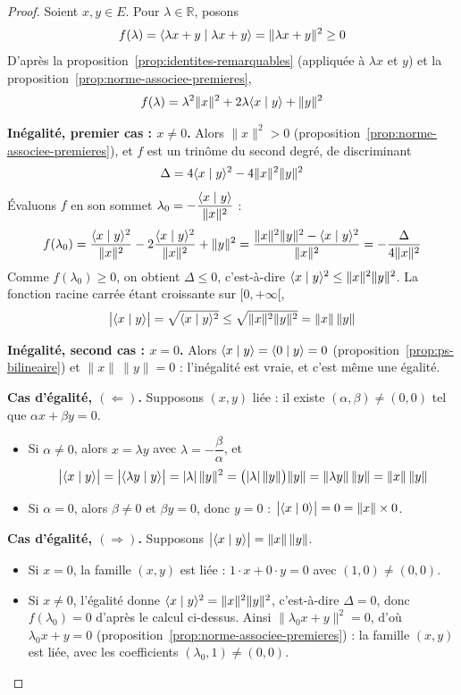 \begin{proof}
Soient $x,y\in E$. Pour $\lambda\in\mathbb{R}$, posons
\[f(\lambda)=\langle \lambda x+y\mid \lambda x+y\rangle=\|\lambda x+y\|^2\geq 0\]
D'après la proposition~\ref{prop:identites-remarquables} (appliquée à $\lambda x$ et $y$) et la proposition~\ref{prop:norme-associee-premieres},
\[f(\lambda)=\lambda^2\|x\|^2+2\lambda\langle x\mid y\rangle+\|y\|^2\]

\textbf{Inégalité, premier cas : $x\neq 0$.} Alors $\|x\|^2>0$ (proposition~\ref{prop:norme-associee-premieres}), et $f$ est un trinôme du second degré, de discriminant
\[\Delta=4\langle x\mid y\rangle^2-4\|x\|^2\|y\|^2\]
Évaluons $f$ en son sommet $\lambda_0=-\dfrac{\langle x\mid y\rangle}{\|x\|^2}$ :
\[f(\lambda_0)=\frac{\langle x\mid y\rangle^2}{\|x\|^2}-2\frac{\langle x\mid y\rangle^2}{\|x\|^2}+\|y\|^2=\frac{\|x\|^2\|y\|^2-\langle x\mid y\rangle^2}{\|x\|^2}=-\frac{\Delta}{4\|x\|^2}\]
Comme $f(\lambda_0)\geq 0$, on obtient $\Delta\leq 0$, c'est-à-dire $\langle x\mid y\rangle^2\leq\|x\|^2\|y\|^2$. La fonction racine carrée étant croissante sur $[0,+\infty[$,
\[\big|\langle x\mid y\rangle\big|=\sqrt{\langle x\mid y\rangle^2}\leq\sqrt{\|x\|^2\|y\|^2}=\|x\|\,\|y\|\]

\textbf{Inégalité, second cas : $x=0$.} Alors $\langle x\mid y\rangle=\langle 0\mid y\rangle=0$ (proposition~\ref{prop:ps-bilineaire}) et $\|x\|\,\|y\|=0$ : l'inégalité est vraie, et c'est même une égalité.

\textbf{Cas d'égalité, $(\Leftarrow)$.} Supposons $(x,y)$ liée : il existe $(\alpha,\beta)\neq(0,0)$ tel que $\alpha x+\beta y=0$.
\begin{itemize}
\item Si $\alpha\neq 0$, alors $x=\lambda y$ avec $\lambda=-\dfrac{\beta}{\alpha}$, et
\[\big|\langle x\mid y\rangle\big|=\big|\langle \lambda y\mid y\rangle\big|=|\lambda|\,\|y\|^2=\big(|\lambda|\,\|y\|\big)\|y\|=\|\lambda y\|\,\|y\|=\|x\|\,\|y\|\]
\item Si $\alpha=0$, alors $\beta\neq 0$ et $\beta y=0$, donc $y=0$ : $\big|\langle x\mid 0\rangle\big|=0=\|x\|\times 0$.
\end{itemize}

\textbf{Cas d'égalité, $(\Rightarrow)$.} Supposons $\big|\langle x\mid y\rangle\big|=\|x\|\,\|y\|$.
\begin{itemize}
\item Si $x=0$, la famille $(x,y)$ est liée : $1\cdot x+0\cdot y=0$ avec $(1,0)\neq(0,0)$.
\item Si $x\neq 0$, l'égalité donne $\langle x\mid y\rangle^2=\|x\|^2\|y\|^2$, c'est-à-dire $\Delta=0$, donc $f(\lambda_0)=0$ d'après le calcul ci-dessus. Ainsi $\|\lambda_0x+y\|^2=0$, d'où $\lambda_0x+y=0$ (proposition~\ref{prop:norme-associee-premieres}) : la famille $(x,y)$ est liée, avec les coefficients $(\lambda_0,1)\neq(0,0)$.\qedhere
\end{itemize}
\end{proof}

